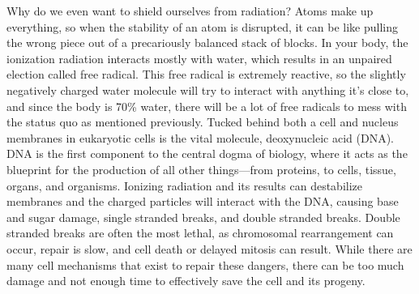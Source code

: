 \documentclass[12pt,twoside]{reedthesis}
\begin{document}
Why do we even want to shield ourselves from radiation? Atoms make up everything, so when the stability of an atom is disrupted, it can be like pulling the wrong piece out of a precariously balanced stack of blocks. In your body, the ionization radiation interacts mostly with water, which results in an unpaired election called free radical. This free radical is extremely reactive, so the slightly negatively charged water molecule will try to interact with anything it's close to, and since the body is 70\% water, there will be a lot of free radicals to mess with the status quo as mentioned previously. Tucked behind both a cell and nucleus membranes in eukaryotic cells is the vital molecule, deoxynucleic acid (DNA). DNA is the first component to the central dogma of biology, where it acts as the blueprint for the production of all other things---from proteins, to cells, tissue, organs, and organisms. Ionizing radiation and its results can destabilize membranes and the charged particles will interact with the DNA, causing base and sugar damage, single stranded breaks, and double stranded breaks. Double stranded breaks are often the most lethal, as chromosomal rearrangement can occur, repair is slow, and cell death or delayed mitosis can result. While there are many cell mechanisms that exist to repair these dangers, there can be too much damage and not enough time to effectively save the cell and its progeny.
\end{document}
